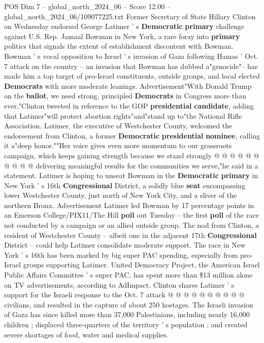 \begin{textsample}{POS Dim 7 – global\_north\_2024\_06 – Score 12.00 – global\_north\_2024\_06/109077225.txt}  \label{ex:f7_pos_083}
Former Secretary of State Hillary Clinton on Wednesday endorsed George Latimer ' s \textbf{Democratic} \textbf{primary} challenge against U.S.
Rep.
Jamaal Bowman in New York, a rare foray into \textbf{primary} politics that signals the extent of establishment discontent with Bowman.
Bowman ' s vocal opposition to Israel ' s invasion of Gaza following Hamas ' Oct. 7 attack on the country -- an invasion that Bowman has dubbed a"genocide"-- has made him a top target of pro-Israel constituents, outside groups, and local elected \textbf{Democrats} with more moderate leanings.
Advertisement"With Donald Trump on the \textbf{ballot}, we need strong, principled \textbf{Democrats} in Congress more than ever,"Clinton tweeted in reference to the GOP \textbf{presidential} \textbf{candidate}, adding that Latimer"will protect abortion rights"and"stand up to"the National Rifle Association.
Latimer, the executive of Westchester County, welcomed the endorsement from Clinton, a former \textbf{Democratic} \textbf{presidential} \textbf{nominee}, calling it a"deep honor.""Her voice gives even more momentum to our grassroots campaign, which keeps gaining strength because we stand strongly @ @ @ @ @ @ @ @ @ @ delivering meaningful results for the communities we serve,"he said in a statement.
Latimer is hoping to unseat Bowman in the \textbf{Democratic} \textbf{primary} in New York ' s 16th \textbf{Congressional} District, a solidly blue \textbf{seat} encompassing lower Westchester County, just north of New York City, and a sliver of the northern Bronx.
Advertisement Latimer led Bowman by 17 percentage points in an Emerson College/PIX11/The Hill \textbf{poll} out Tuesday -- the first \textbf{poll} of the race not conducted by a campaign or an allied outside group.
The nod from Clinton, a resident of Westchester County -- albeit one in the adjacent 17th \textbf{Congressional} District -- could help Latimer consolidate moderate support.
The race in New York ' s 16th has been marked by big super PAC spending, especially from pro-Israel groups supporting Latimer.
United Democracy Project, the American Israel Public Affairs Committee ' s super PAC, has spent more than \$13 million alone on TV advertisements, according to AdImpact.
Clinton shares Latimer ' s support for the Israeli response to the Oct. 7 attack @ @ @ @ @ @ @ @ @ @ civilians, and resulted in the capture of about 250 hostages.
The Israeli invasion of Gaza has since killed more than 37,000 Palestinians, including nearly 16,000 children ; displaced three-quarters of the territory ' s population ; and created severe shortages of food, water and medical supplies.

\end{textsample}
